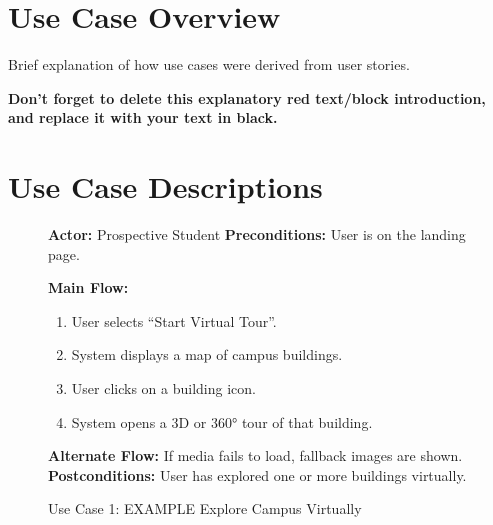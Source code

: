 \section{Use Case Overview} %

\begin{tcolorbox}[      %
    boxrule=0pt,        %
    colback=white,      %
    coltext=red         %
]                       %
    Brief explanation of how use cases were derived from user stories.

    \vspace{15pt}       %
    \begin{center}      %
    \textbf{Don't forget to delete this explanatory red text/block introduction, and replace it with your text in black.}
    \end{center}        %
\end{tcolorbox}         %

\section{Use Case Descriptions} %

\begin{figure}[h!]
    \centering
    \begin{tcolorbox}[title=Use Case 1: EXAMPLE Explore Campus Virtually]
        \textbf{Actor:} Prospective Student
        \textbf{Preconditions:} User is on the landing page.

        \textbf{Main Flow:}
        \begin{enumerate}
            \item User selects “Start Virtual Tour”.
            \item System displays a map of campus buildings.
            \item User clicks on a building icon.
            \item System opens a 3D or 360° tour of that building.
        \end{enumerate}

        \textbf{Alternate Flow:} If media fails to load, fallback images are shown.
        \textbf{Postconditions:} User has explored one or more buildings virtually.
    \end{tcolorbox}

    \vspace*{-5pt}
    \caption{Use Case 1: EXAMPLE Explore Campus Virtually}
    \label{fig:usecase1}
\end{figure}

